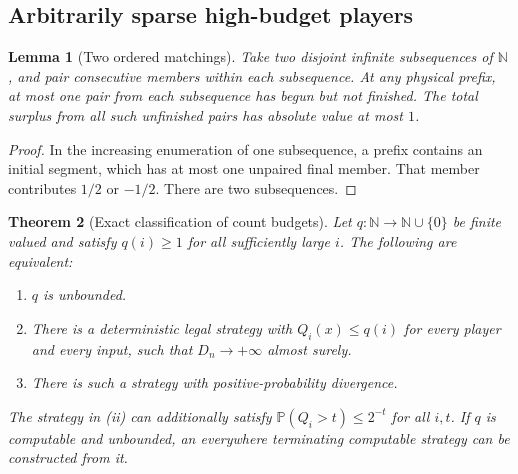 \documentclass[11pt,letterpaper]{article}
\newtheorem{theorem}{Theorem}[section]
\newtheorem{lemma}[theorem]{Lemma}
\theoremstyle{definition}
\newcommand{\N}{\mathbb N}
\newcommand{\Prb}{\mathbb P}
\begin{document}
\subsection{Arbitrarily sparse high-budget players}

\begin{lemma}[Two ordered matchings]
\label{mbg:qry:lem:matchings}
Take two disjoint infinite subsequences of \(\N\), and pair consecutive
members within each subsequence. At any physical prefix,
at most one pair from each subsequence has begun but not finished.
The total surplus from all such unfinished pairs has absolute value
at most \(1\).
\end{lemma}

\begin{proof}
In the increasing enumeration of one subsequence, a prefix contains an
initial segment, which has at most one unpaired final member.
That member contributes \(1/2\) or \(-1/2\). There are two subsequences.
\end{proof}

\begin{theorem}[Exact classification of count budgets]
\label{mbg:qry:thm:budgets}
Let \(q:\N\to\N\cup\{0\}\) be finite valued and satisfy \(q(i)\ge1\)
for all sufficiently large \(i\). The following are equivalent:
\begin{enumerate}[label=(\roman*)]
\item \(q\) is unbounded.
\item There is a deterministic legal strategy with \(Q_i(x)\le q(i)\)
for every player and every input, such that \(D_n\to+\infty\) almost surely.
\item There is such a strategy with positive-probability divergence.
\end{enumerate}
The strategy in (ii) can additionally satisfy
\(\Prb(Q_i>t)\le2^{-t}\) for all \(i,t\).
If \(q\) is computable and unbounded, an everywhere terminating
computable strategy can be constructed from it.
\end{theorem}
\end{document}
